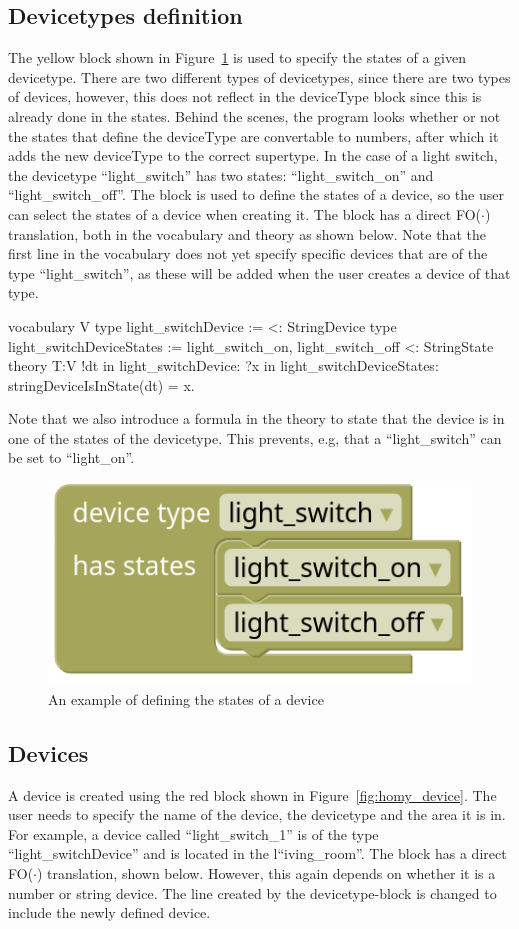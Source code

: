 \documentclass[11pt,a4paper]{report}
\newcommand{\fodot}{FO($\cdot$)\xspace}
\begin{document}
\subsection{Devicetypes definition}
The yellow block shown in Figure~\ref{fig:homy_device_type} is used to specify the states of a given devicetype. There are two different types of devicetypes, since there are two types of devices, however, this does not reflect in the deviceType block since this is already done in the states. Behind the scenes, the program looks whether or not the states that define the deviceType are convertable to numbers, after which it adds the new deviceType to the correct supertype. In the case of a light switch, the devicetype ``light\_switch'' has two states: ``light\_switch\_on'' and ``light\_switch\_off''. The block is used to define the states of a device, so the user can select the states of a device when creating it. The block has a direct \fodot translation, both in the vocabulary and theory as shown below. Note that the first line in the vocabulary does not yet specify specific devices that are of the type ``light\_switch'', as these will be added when the user creates a device of that type.
\begin{idplisting}
vocabulary V {
    type light_switchDevice := {} <: StringDevice
    type light_switchDeviceStates := {light_switch_on, light_switch_off} <: StringState
}
theory T:V {
    !dt in light_switchDevice: ?x in light_switchDeviceStates: stringDeviceIsInState(dt) = x.
}
\end{idplisting}

Note that we also introduce a formula in the theory to state that the device is in one of the states of the devicetype. This prevents, e.g, that a ``light\_switch'' can be set to ``light\_on''.

\begin{figure}
    \centering
    \includegraphics[width=0.4\linewidth]{images/homy_device_type.png}
    \caption{An example of defining the states of a device}
    \label{fig:homy_device_type}
\end{figure}

\subsection{Devices}
A device is created using the red block shown in Figure~\ref{fig:homy_device}. The user needs to specify the name of the device, the devicetype and the area it is in. For example, a device called ``light\_switch\_1'' is of the type ``light\_switchDevice'' and is located in the l``iving\_room''. The block has a direct \fodot translation, shown below. However, this again depends on whether it is a number or string device. The line created by the devicetype-block is changed to include the newly defined device.
\end{document}
